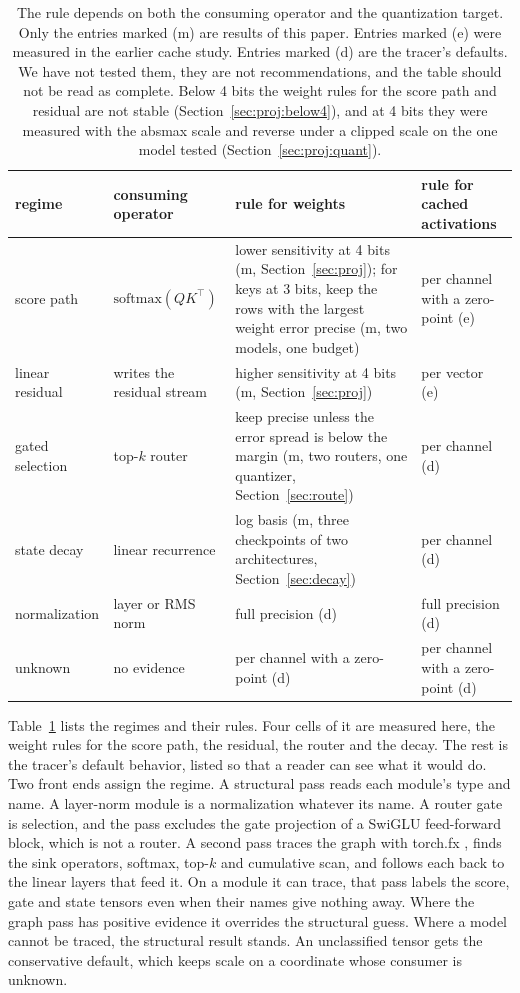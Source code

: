 \documentclass[10pt]{article}
\begin{document}
\begin{table}[t]
\centering
\small
\begin{tabular}{p{2.4cm}p{3.0cm}p{4.3cm}p{4.3cm}}
\toprule
regime & consuming operator & rule for weights & rule for cached activations \\
\midrule
score path & $\mathrm{softmax}(QK^\top)$ & lower sensitivity at 4 bits (m, Section~\ref{sec:proj}); for keys at 3 bits, keep the rows with the largest weight error precise (m, two models, one budget) & per channel with a zero-point (e) \\
linear residual & writes the residual stream & higher sensitivity at 4 bits (m, Section~\ref{sec:proj}) & per vector (e) \\
gated selection & top-$k$ router & keep precise unless the error spread is below the margin (m, two routers, one quantizer, Section~\ref{sec:route}) & per channel (d) \\
state decay & linear recurrence & log basis (m, three checkpoints of two architectures, Section~\ref{sec:decay}) & per channel (d) \\
normalization & layer or RMS norm & full precision (d) & full precision (d) \\
unknown & no evidence & per channel with a zero-point (d) & per channel with a zero-point (d) \\
\bottomrule
\end{tabular}
\caption{The rule depends on both the consuming operator and the quantization target. Only the
entries marked (m) are results of this paper. Entries marked (e) were measured in the earlier
cache study. Entries marked (d) are the tracer's defaults. We have not tested them, they are not
recommendations, and the table should not be read as complete. Below 4 bits the weight rules for the score path
and residual are not stable (Section~\ref{sec:proj:below4}), and at 4 bits they were measured
with the absmax scale and reverse under a clipped scale on the one model tested
(Section~\ref{sec:proj:quant}).}
\label{tab:regimes}
\end{table}

Table~\ref{tab:regimes} lists the regimes and their rules. Four cells of it are measured here,
the weight rules for the score path, the residual, the router and the decay. The rest is the
tracer's default behavior, listed so that a reader can see what it would do. Two front ends assign the regime. A
structural pass reads each module's type and name. A layer-norm module is a normalization whatever
its name. A router gate is selection, and the pass excludes the gate projection of a SwiGLU
feed-forward block, which is not a router. A second pass traces the graph with torch.fx
\citep{reed2022torchfx}, finds the sink operators, softmax, top-$k$ and cumulative scan, and
follows each back to the linear layers that feed it. On a module it can trace, that pass labels the score, gate and state
tensors even when their names give nothing away. Where the graph pass has positive evidence it
overrides the structural guess. Where a model cannot be traced, the structural result stands. An
unclassified tensor gets the conservative default, which keeps scale on a coordinate whose
consumer is unknown.
\end{document}
